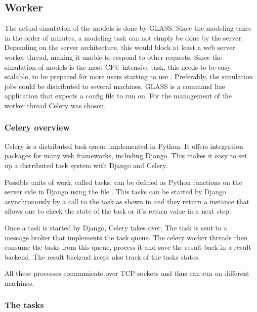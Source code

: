 \subsection{Worker}
\label{sec:worker}

The actual simulation of the models is done by GLASS.
Since the modeling takes in the order of minutes, a modeling task can not simply be done by the server.
Depending on the server architecture, this would block at least a web server worker thread, making it unable to respond to other requests.
Since the simulation of models is the most CPU intensive task, this needs to be easy scalable, to be prepared for more users starting to use \spl. 
Preferably, the simulation jobs could be distributed to several machines.
GLASS is a command line application that expects a config file to run on.
For the management of the worker thread Celery was chosen.


\subsubsection{Celery overview}
Celery is a distributed task queue implemented in Python.
It offers integration packages for many web frameworks, including Django.
This makes it easy to set up a distributed task system with Django and Celery.


Possible units of work, called tasks, can be defined as Python functions on the server side in Django using the file .
This tasks can be started by Django asynchronously by a call to the task as shown in  and they return a  instance that allows one to check the state of the task or it's return value in a next step.

Once a task is started by Django, Celery takes over.
The task is sent to a message broker that implements the task queue.
The celery worker threads then consume the tasks from this queue, process it and save the result back in a result backend. The result backend keeps also track of the tasks states.

All these processes communicate over TCP sockets and thus can run on different machines.

\subsubsection{The tasks}

